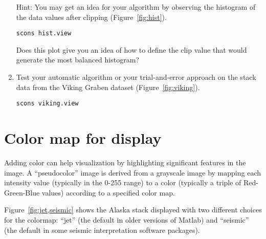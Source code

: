 \begin{enumerate}
Hint: You may get an idea for your algorithm by observing the histogram of the data values after clipping (Figure~\ref{fig:hist}).
\begin{verbatim}
scons hist.view
\end{verbatim}
Does this plot give you an idea of how to define the clip value that would generate the most balanced histogram? 


\item Test your automatic algorithm or your trial-and-error approach on the stack data from the Viking Graben dataset (Figure~\ref{fig:viking}).
\begin{verbatim}
scons viking.view
\end{verbatim}


\end{enumerate}

\lstset{language=c,numbers=left,numberstyle=\tiny,showstringspaces=false}


\lstset{language=python,numbers=left,numberstyle=\tiny,showstringspaces=false}


\section{Color map for display}

Adding color can help visualization by highlighting significant
features in the image. A ``pseudocolor'' image is derived from a
grayscale image by mapping each intensity value (typically in the
0-255 range) to a color (typically a triple of Red-Green-Blue values)
according to a specified color map.

Figure~\ref{fig:jet,seismic} shows the Alaska stack displayed with two
different choices for the colormap: ``jet'' (the default in older
versions of Matlab) and ``seismic'' (the default in some seismic
interpretation software packages). 

